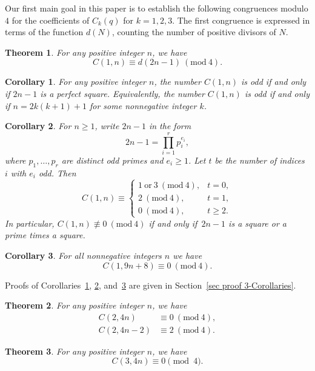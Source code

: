 \documentclass[reqno]{amsart}
\theoremstyle{definition}
\theoremstyle{plain}
\newtheorem{theorem}    {Theorem}
\newtheorem{corollary}  {Corollary}
\theoremstyle{remark}
\numberwithin{equation}{section}
\newcommand{\Mod}[1]{\ (\mathrm{mod}\ #1)}
\begin{document}
Our first main goal in this paper is to establish the following congruences modulo $4$ for the coefficients of $C_k(q)$ for $k=1,2,3$.
The first congruence is expressed in terms of the function $d(N)$, counting the number of positive divisors of $N$.
%
\begin{theorem}\label{thm cong1}
For any positive integer $n$, we have
\[
C(1,n) \equiv d(2n-1) \Mod{4}.
\]
\end{theorem}
%
\begin{corollary}\label{cor odd-C1}
For any positive integer $n$, the number $C(1,n)$ is odd if and only if $2n-1$ is a perfect square. Equivalently,
the number $C(1,n)$ is odd if and only if $n=2k(k+1)+1$ for some nonnegative integer $k$.
\end{corollary}
%
\begin{corollary}\label{cor C1-mod4}
For $n\geq 1$, write $2n-1$ in the form
\[
2n-1 = \prod_{i=1}^r p_i^{e_i},
\]
where $p_1,\ldots,p_r$ are distinct odd primes and $e_i\geq 1$. Let $t$ be the number of indices $i$ with $e_i$ odd. Then
\[
C(1,n) \equiv
\begin{cases}
1\ \text{or}\ 3 \Mod{4}, & t=0, \\
2 \Mod{4}, & t=1, \\
0 \Mod{4}, & t\geq 2.
\end{cases}
\]
In particular, $C(1,n)\not\equiv 0\Mod{4}$ if and only if\  $2n-1$ is a square or a prime times a square.
\end{corollary}
%
\begin{corollary}\label{cor 9n+8}
For all nonnegative integers $n$ we have
\[
C(1,9n+8) \equiv 0 \Mod{4}.
\]
\end{corollary}
%
\medskip

Proofs of Corollaries~\ref{cor odd-C1}, \ref{cor C1-mod4}, and~\ref{cor 9n+8} are given in Section~\ref{sec proof 3-Corollaries}.
%
\begin{theorem}\label{thm cong2}
For any positive integer $n$, we have
\begin{align}
C(2,4n) &\equiv 0 \Mod{4}, \label{cong2-1} \\
C(2,4n-2) &\equiv 2 \Mod{4}. \label{cong2-2}
\end{align}
\end{theorem}
%
\begin{theorem}\label{thm cong3}
For any positive integer $n$, we have
\[
C(3,4n) \equiv 0 \pmod{4}.
\]
\end{theorem}
\end{document}
